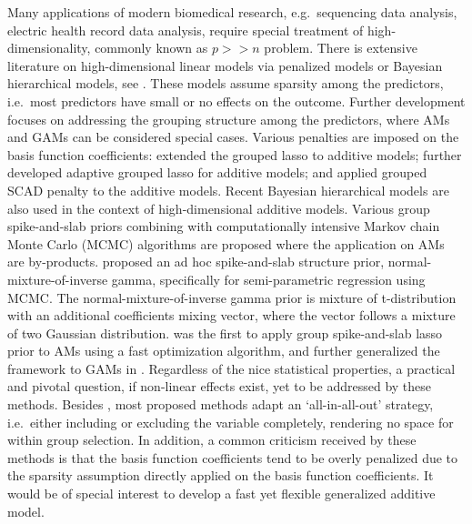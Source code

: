 \documentclass[AMA,STIX1COL,]{WileyNJD-v2}
\begin{document}
Many applications of modern biomedical research, e.g.~sequencing data
analysis, electric health record data analysis, require special
treatment of high-dimensionality, commonly known as \(p >> n\) problem.
There is extensive literature on high-dimensional linear models via
penalized models or Bayesian hierarchical models, see
\citet{Mallick2013}. These models assume sparsity among the predictors,
i.e.~most predictors have small or no effects on the outcome. Further
development focuses on addressing the grouping structure among the
predictors, where AMs and GAMs can be considered special cases. Various
penalties are imposed on the basis function coefficients:
\citet{Ravikumar2009} extended the grouped lasso \citep{Yuan2006} to
additive models; \citet{Huang2010} further developed adaptive grouped
lasso for additive models; \citet{Wang2007} and \citet{Xue2009} applied
grouped SCAD penalty \citep{Fan2001} to the additive models. Recent
Bayesian hierarchical models are also used in the context of
high-dimensional additive models. Various group spike-and-slab priors
combining with computationally intensive Markov chain Monte Carlo (MCMC)
algorithms \citep{Xu2015, Yang2020} are proposed where the application
on AMs are by-products. \citet{Scheipl2012} proposed an ad hoc
spike-and-slab structure prior, normal-mixture-of-inverse gamma,
specifically for semi-parametric regression using MCMC. The
normal-mixture-of-inverse gamma prior is mixture of t-distribution with
an additional coefficients mixing vector, where the vector follows a
mixture of two Gaussian distribution. \citet{Bai2020} was the first to
apply group spike-and-slab lasso prior to AMs using a fast optimization
algorithm, and further generalized the framework to GAMs in
\citet{Bai2021}. Regardless of the nice statistical properties, a
practical and pivotal question, if non-linear effects exist, yet to be
addressed by these methods. Besides \citet{Schipel2012}, most proposed
methods adapt an `all-in-all-out' strategy, i.e.~either including or
excluding the variable completely, rendering no space for within group
selection. In addition, a common criticism received by these methods is
that the basis function coefficients tend to be overly penalized due to
the sparsity assumption directly applied on the basis function
coefficients.\citep{Scheipl2013} It would be of special interest to
develop a fast yet flexible generalized additive model.
\end{document}
